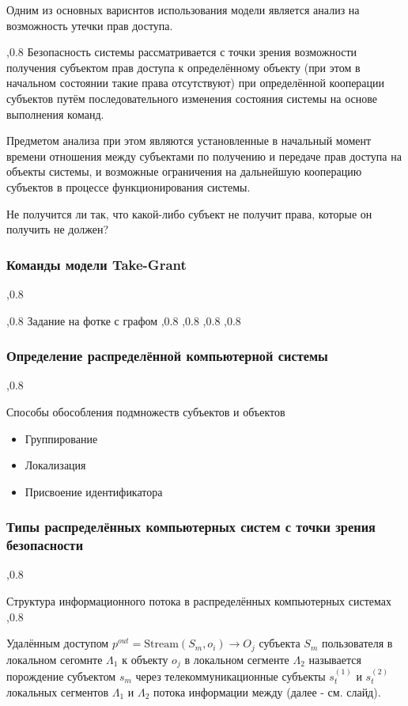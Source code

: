 \documentclass[a4paper,12pt]{report}
\begin{document}
	Одним из основных вариснтов использования модели является анализ на возможность утечки прав доступа.
	
	,0.8
	Безопасность системы рассматривается с точки зрения возможности получения субъектом прав доступа к определённому объекту (при этом в начальном состоянии такие права отсутствуют) при определённой кооперации субъектов путём последовательного изменения состояния системы на основе выполнения команд.

	Предметом анализа при этом являются установленные в начальный момент времени отношения между субъектами по получению и передаче прав доступа на объекты системы, и возможные ограничения на дальнейшую кооперацию субъектов в процессе функционирования системы.

	Не получится ли так, что какой-либо субъект не получит права, которые он получить не должен?

	\subsubsection{Команды модели Take-Grant}
	,0.8

	,0.8
	Задание на фотке с графом
	,0.8
	,0.8
	,0.8
	,0.8
	
	\subsubsection{Определение распределённой компьютерной системы}
	,0.8

	Способы обособления подмножеств субъектов и объектов
	\begin{itemize}
		\item Группирование
		\item Локализация
		\item Присвоение идентификатора
	\end{itemize}

	\subsubsection{Типы распределённых компьютерных систем с точки зрения безопасности}
	,0.8

	Структура информационного потока в распределённых компьютерных системах
	,0.8

	 Удалённым доступом $p^{out} = \mbox{Stream}(S_m,o_i) \rightarrow O_j$ субъекта $S_m$ пользователя в локальном сегомнте $\Lambda_1$ к объекту $o_j$ в локальном сегменте $\Lambda_2$ называется порождение субъектом $s_m$ через телекоммуникационные субъекты $s^{(1)}_t$ и $s^{(2)}_t$ локальных сегментов $\Lambda_1$ и $\Lambda_2$ потока информации между (далее - см. слайд).
\end{document}
